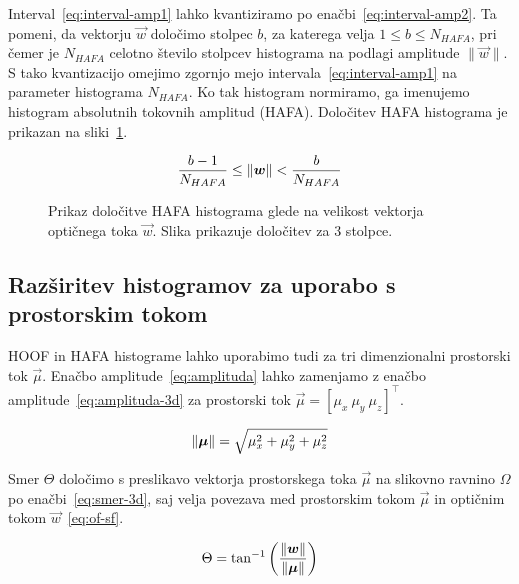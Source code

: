 Interval~\eqref{eq:interval-amp1} lahko kvantiziramo po enačbi~\eqref{eq:interval-amp2}. Ta pomeni, da vektorju $\vec{w}$ določimo stolpec $b$, za katerega velja $1 \leq b \leq N_{HAFA}$, pri čemer je $N_{HAFA}$ celotno število stolpcev histograma na podlagi amplitude $\| \vec{w} \|$. S tako kvantizacijo omejimo zgornjo mejo intervala~\eqref{eq:interval-amp1} na parameter histograma $N_{HAFA}$. Ko tak histogram normiramo, ga imenujemo histogram absolutnih tokovnih amplitud (HAFA). Določitev HAFA histograma je prikazan na sliki~\ref{fig:hafa-histogram}.

\begin{equation}\label{eq:interval-amp2}
	\frac{b-1}{N_{HAFA}} \leq \left\lVert {\boldsymbol{w}} \right\rVert < \frac{b}{N_{HAFA}}
\end{equation}




\begin{figure}[!htb]
\centering
\resizebox{0.5\columnwidth}{!}{}
\caption[Prikaz določitve HAFA histograma glede na velikost vektorja]{Prikaz določitve HAFA histograma glede na velikost vektorja optičnega toka $\vec{w}$. Slika prikazuje določitev za $3$ stolpce.}
\label{fig:hafa-histogram}
\end{figure}



\subsection{Razširitev histogramov za uporabo s prostorskim tokom}
HOOF in HAFA histograme lahko uporabimo tudi za tri dimenzionalni prostorski tok $\vec{\mu}$. Enačbo amplitude~\eqref{eq:amplituda} lahko zamenjamo z enačbo amplitude~\eqref{eq:amplituda-3d} za prostorski tok $\vec{\mu} = \left[\mu_x~\mu_y~\mu_z \right]^\top$.

\begin{equation}
\left\lVert {\boldsymbol{\mu}} \right\rVert = \sqrt{\mu_x^2 + \mu_y^2 + \mu_z^2} 
\label{eq:amplituda-3d}
\end{equation}

Smer $\Theta$ določimo s preslikavo vektorja prostorskega toka $\vec{\mu}$ na slikovno ravnino $\varOmega$ po enačbi~\eqref{eq:smer-3d}, saj velja povezava med prostorskim tokom $\vec{\mu}$ in optičnim tokom $\vec{w}$~\eqref{eq:of-sf}.


\begin{equation}
\Theta = \tan^{-1}\left( \frac{\left\lVert {\boldsymbol{w}} \right\rVert}{\left\lVert {\boldsymbol{\mu}} \right\rVert} \right)
\label{eq:smer-3d}
\end{equation}

